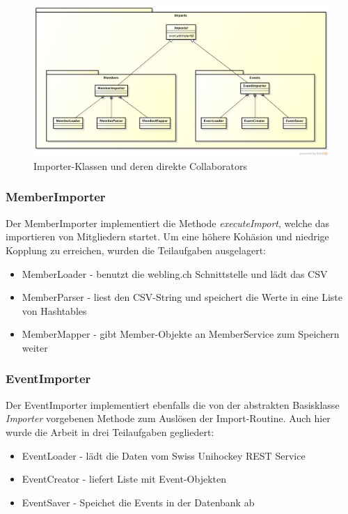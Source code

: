 	
	\begin{figure}[h!]
  		\centering
    	  \includegraphics[width=\textwidth]{content/architekturdokumentation/images/ImportPackageDesign.png}
		 \caption{Importer-Klassen und deren direkte Collaborators}
	\end{figure}
	
	\subsubsection{MemberImporter}
	Der MemberImporter implementiert die Methode \textit{executeImport}, welche das importieren von Mitgliedern startet. Um eine höhere Kohäsion und niedrige Kopplung zu erreichen, wurden die Teilaufgaben ausgelagert:
	\\\begin{itemize}	
		\item MemberLoader - benutzt die webling.ch Schnittstelle und lädt das CSV
		\item MemberParser - liest den CSV-String und speichert die Werte in eine Liste von Hashtables
		\item MemberMapper - gibt Member-Objekte an MemberService zum Speichern weiter\\
	\end{itemize}



	\subsubsection{EventImporter}
	Der EventImporter implementiert ebenfalls die von der abstrakten Basisklasse \textit{Importer} vorgebenen Methode zum Auslösen der Import-Routine. Auch hier wurde die Arbeit in drei Teilaufgaben gegliedert:
	\\\begin{itemize}	
		\item EventLoader - lädt die Daten vom Swiss Unihockey REST Service
		\item EventCreator - liefert Liste mit Event-Objekten
		\item EventSaver - Speichet die Events in der Datenbank ab\\
	\end{itemize}
	
